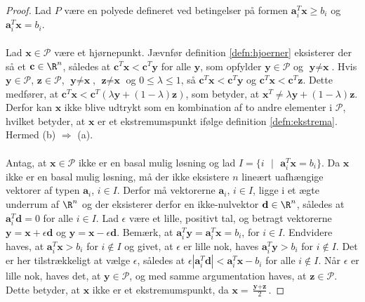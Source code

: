 %
\begin{proof}
Lad $P$ være en polyede defineret ved betingelser på formen $\textbf{a}_i^T\textbf{x} \geq b_i$ og $\textbf{a}_i^T\textbf{x} = b_i$.\\\\
%
Lad $\textbf{x} \in \mathcal{P}$ være et hjørnepunkt. Jævnfør definition \ref{defn:hjoerner} eksisterer der så et $\textbf{c} \in \R^n$, således at $\textbf{c}^T\textbf{x} < \textbf{c}^T\textbf{y}$ for alle $\textbf{y}$, som opfylder $\textbf{y} \in \mathcal{P}$ og $\textbf{y} \neq \textbf{x}$.
Hvis $\textbf{y} \in \mathcal{P}$, $\textbf{z} \in \mathcal{P}$, $\textbf{y} \neq \textbf{x}$, $\textbf{z} \neq \textbf{x}$ og $0 \leq \lambda \leq 1$, så $\textbf{c}^T\textbf{x} < \textbf{c}^T\textbf{y}$ og $\textbf{c}^T\textbf{x} < \textbf{c}^T\textbf{z}$.
Dette medfører, at $\textbf{c}^T\textbf{x} < \textbf{c}^T(\lambda \textbf{y} + (1-\lambda)\textbf{z})$, som betyder, at $\textbf{x}^T \neq \lambda \textbf{y} + (1 - \lambda)\textbf{z}$.
Derfor kan $\textbf{x}$ ikke blive udtrykt som en kombination af to andre elementer i $\mathcal{P}$, hvilket betyder, at $\textbf{x}$ er et ekstremumspunkt ifølge definition \ref{defn:ekstrema}.
Hermed (b) $\Rightarrow$ (a).
\\\\
%
Antag, at $\textbf{x} \in \mathcal{P}$ ikke er en basal mulig løsning og lad $I = \{ i \text{ } | \text{ }  \textbf{a}_i^T \textbf{x} = b_i\}$.
Da $\textbf{x}$ ikke er en basal mulig løsning, må der ikke eksistere $n$ lineært uafhængige vektorer af typen $\textbf{a}_i$, $i \in I$.
Derfor må vektorerne $\textbf{a}_i$, $i \in I$, ligge i et ægte underrum af $\R^n$ og der eksisterer derfor en ikke-nulvektor $\textbf{d} \in \R^n$, således at $\textbf{a}_i^T\textbf{d} = 0$ for alle $i \in I$.
Lad $\epsilon$ være et lille, positivt tal, og betragt vektorerne $\textbf{y} = \textbf{x} + \epsilon\textbf{d}$ og $\textbf{y} = \textbf{x} - \epsilon\textbf{d}$.
Bemærk, at $\textbf{a}_i^T \textbf{y} = \textbf{a}_i^T \textbf{x} = b_i$, for $i \in I$.
Endvidere haves, at $\textbf{a}_i^T \textbf{x} > b_i$ for $i \notin I$ og givet, at $\epsilon$ er lille nok, haves $\textbf{a}_i^T \textbf{y} > b_i$ for $i \notin I$.
Det er her tilstrækkeligt at vælge $\epsilon$, således at $\epsilon |\textbf{a}_i^T\textbf{d}| < \textbf{a}_i^T\textbf{x} - b_i$ for alle $i \notin I$.
Når $\epsilon$ er lille nok, haves det, at $\textbf{y} \in \mathcal{P}$, og med samme argumentation haves, at $\textbf{z} \in \mathcal{P}$.
Dette betyder, at $\textbf{x}$ ikke er et ekstremumspunkt, da $\textbf{x} = \frac{\textbf{y} + \textbf{z}}{2}$.

\end{proof}
